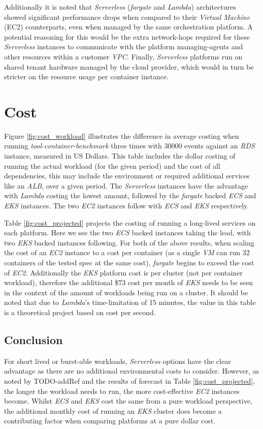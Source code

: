 Additionally it is noted that \textit{Serverless} (\textit{fargate} and \textit{Lambda})
architectures showed significant performance drops when compared to their \textit{Virtual Machine} (EC2) counterparts,
even when managed by the same orchestration platform.
A potential reasoning for this would be the extra network-hops required for these \textit{Serverless}
instances to communicate with the platform managing-agents and other resources within a customer \textit{VPC}.
Finally, \textit{Serverless} platforms run on shared tenant hardware managed by the cloud provider,
which would in turn be stricter on the resource usage per container instance.

\section{Cost}
Figure \ref{fig:cost_workload} illustrates the difference in average costing when running \emph{tool-container-benchmark} three times with 30000 events against an \textit{RDS} instance, measured in US Dollars.
This table includes the dollar costing of running the actual workload (for the given period) and the cost of all dependencies,
this may include the environment or required additional services like an \textit{ALB}, over a given period.
The \textit{Serverless} instances have the advantage with \textit{Lambda} costing the lowest amount, followed by the \textit{fargate} backed \textit{ECS} and \textit{EKS} instances.
The two \textit{EC2} instances follow with \textit{ECS} and \textit{EKS} respectively.

Table \ref{fig:cost_projected} projects the costing of running a long-lived services on each platform. Here we see the two \textit{ECS} backed instances taking the lead,
with two \textit{EKS} backed instances following. For both of the above results, when scaling the cost of an \textit{EC2} instance to a cost per container
(as a single \textit{VM} can run 32 containers of the tested spec at the same cost), \textit{fargate} begins to exceed the cost of \textit{EC2}.
Additionally the \textit{EKS} platform cost is per cluster (not per container workload), therefore the additional \$73 cost per month of \textit{EKS} needs to be seen in the context of the amount of workloads being run on a cluster.
It should be noted that due to \textit{Lambda}'s time-limitation of 15 minutes, the value in this table is a theoretical project based on cost per second.

\subsection*{Conclusion}
For short lived or burst-able workloads, \textit{Serverless} options have the clear advantage as there are no additional environmental costs to consider.
However, as noted by TODO-addRef and the results of forecast in Table \ref{fig:cost_projected}, the longer the workload needs to run, the more cost-effective \textit{EC2} instances become.
Whilst \textit{ECS} and \textit{EKS} cost the same from a pure workload perspective, the additional monthly cost of running an \textit{EKS} cluster does become a contributing factor
when comparing platforms at a pure dollar cost.


